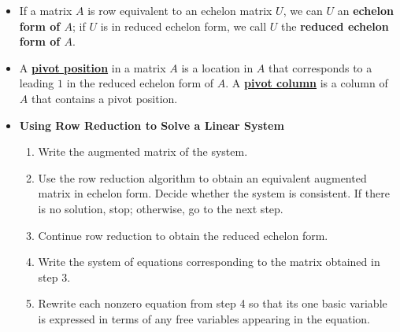 \documentclass{article}
\newcommand{\definition}[1]{\underline{\textbf{#1}}}
\begin{document}
\begin{itemize}

  \item If a matrix $A$ is row equivalent to an echelon matrix $U$, we can $U$ an \textbf{echelon form of $A$}; if $U$ is in reduced echelon form, we call $U$ the \textbf{reduced echelon form of $A$}.

  \item A \definition{pivot position} in a matrix $A$ is a location in $A$ that corresponds to a leading $1$ in the reduced echelon form of $A$. A \definition{pivot column} is a column of $A$ that contains a pivot position.

  \item \textbf{Using Row Reduction to Solve a Linear System}
  \begin{enumerate}
    \item Write the augmented matrix of the system.
    \item Use the row reduction algorithm to obtain an equivalent augmented matrix in echelon form. Decide whether the system is consistent. If there is no solution, stop; otherwise, go to the next step.
    \item Continue row reduction to obtain the reduced echelon form.
    \item Write the system of equations corresponding to the matrix obtained in step 3.
    \item Rewrite each nonzero equation from step 4 so that its one basic variable is expressed in terms of any free variables appearing in the equation.
  \end{enumerate}

\end{itemize}
\end{document}
